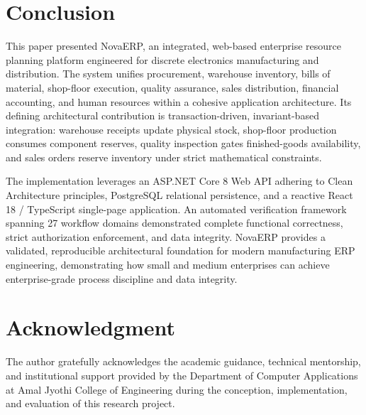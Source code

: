 \documentclass[conference]{IEEEtran}
\begin{document}
\section{Conclusion}
This paper presented NovaERP, an integrated, web-based enterprise resource planning platform engineered for discrete electronics manufacturing and distribution. The system unifies procurement, warehouse inventory, bills of material, shop-floor execution, quality assurance, sales distribution, financial accounting, and human resources within a cohesive application architecture. Its defining architectural contribution is transaction-driven, invariant-based integration: warehouse receipts update physical stock, shop-floor production consumes component reserves, quality inspection gates finished-goods availability, and sales orders reserve inventory under strict mathematical constraints.

The implementation leverages an ASP.NET Core 8 Web API adhering to Clean Architecture principles, PostgreSQL relational persistence, and a reactive React 18 / TypeScript single-page application. An automated verification framework spanning 27 workflow domains demonstrated complete functional correctness, strict authorization enforcement, and data integrity. NovaERP provides a validated, reproducible architectural foundation for modern manufacturing ERP engineering, demonstrating how small and medium enterprises can achieve enterprise-grade process discipline and data integrity.

\section*{Acknowledgment}
The author gratefully acknowledges the academic guidance, technical mentorship, and institutional support provided by the Department of Computer Applications at Amal Jyothi College of Engineering during the conception, implementation, and evaluation of this research project.
\end{document}
